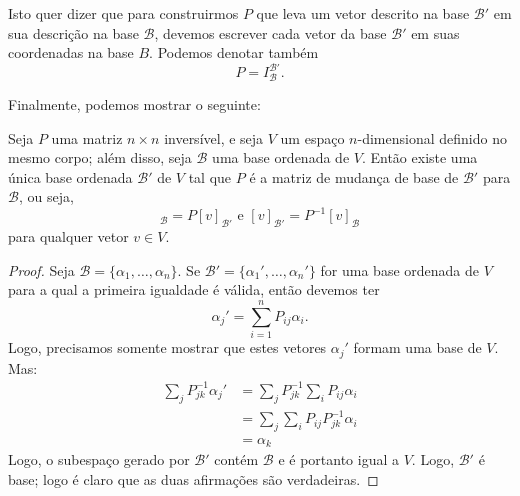 Isto quer dizer que para construirmos $P$ que leva um vetor descrito na base ${\mathcal{B}}'$ em sua descrição na base ${\mathcal{B}}$, devemos escrever cada vetor da base ${\mathcal{B}}'$ em suas coordenadas na base $B$. Podemos denotar também 
\begin{equation*}
	P=I_{\mathcal{B}}^{{\mathcal{B}}'}.
\end{equation*}

Finalmente, podemos mostrar o seguinte:
\begin{teo}
  Seja $P$ uma matriz $n\times n$ inversível, e seja $V$ um espaço $n$-dimensional definido no mesmo corpo; além disso, seja ${\mathcal{B}}$ uma base ordenada de $V$. Então existe uma única base ordenada ${\mathcal{B}}'$ de $V$ tal que $P$ é a matriz de mudança de base de ${\mathcal{B}}'$ para ${\mathcal{B}}$, ou seja, 
  \begin{equation*}
     [v]_{\mathcal{B}} = P[v]_{{\mathcal{B}}'} \mbox{ e } [v]_{{\mathcal{B}}'} = P^{-1}[v]_{\mathcal{B}}
  \end{equation*}
  para qualquer vetor $v\in V$.
\end{teo}
\begin{proof}
Seja ${\mathcal{B}} = \{\alpha_1,\ldots,\alpha_n\}$. Se ${\mathcal{B}}' = \{ \alpha_1',\ldots,\alpha_n'\}$ for uma base ordenada de $V$ para a qual a primeira igualdade é válida, então devemos ter
\begin{equation*}
   \alpha_j' = \sum_{i=1}^n P_{ij} \alpha_i.
\end{equation*}
Logo, precisamos somente mostrar que estes vetores $\alpha_j'$ formam uma base de $V$. Mas:
\begin{align*}
  \sum_j P^{-1}_{jk}\alpha_j' &= \sum_j P^{-1}_{jk} \sum_i P_{ij}\alpha_i\\
  &= \sum_j \sum_i P_{ij}P^{-1}_{jk} \alpha_i\\
  &= \alpha_k
\end{align*}
Logo, o subespaço gerado por ${\mathcal{B}}'$ contém ${\mathcal{B}}$ e é portanto igual a $V$. Logo, ${\mathcal{B}}'$ é base; logo é claro que as duas afirmações são verdadeiras.
\end{proof}

